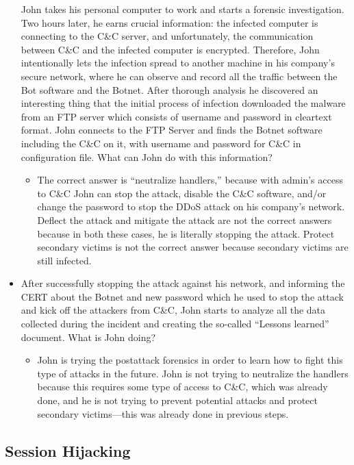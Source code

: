 \begin{itemize}
    John takes his personal computer to work and starts a forensic investigation. Two hours later, he earns crucial information: the infected computer is connecting to the C\&C server, and unfortunately, the communication between C\&C and the infected computer is encrypted. Therefore, John intentionally lets the infection spread to another machine in his company's secure network, where he can observe and record all the traffic between the Bot software and the Botnet. After thorough analysis he discovered an interesting thing that the initial process of infection downloaded the malware from an FTP server which consists of username and password in cleartext format. John connects to the FTP Server and finds the Botnet software including the C\&C on it, with username and password for C\&C in configuration file. What can John do with this information?
    \begin{itemize}
        \item The correct answer is “neutralize handlers,” because with admin's access to C\&C John can stop the attack, disable the C\&C software, and/or change the password to stop the DDoS attack on his company's network. Deflect the attack and mitigate the attack are not the correct answers because in both these cases, he is literally stopping the attack. Protect secondary victims is not the correct answer because secondary victims are still infected.
    \end{itemize}
    \item After successfully stopping the attack against his network, and informing the CERT about the Botnet and new password which he used to stop the attack and kick off the attackers from C\&C, John starts to analyze all the data collected during the incident and creating the so-called “Lessons learned” document. What is John doing?
    \begin{itemize}
        \item John is trying the postattack forensics in order to learn how to fight this type of attacks in the future. John is not trying to neutralize the handlers because this requires some type of access to C\&C, which was already done, and he is not trying to prevent potential attacks and protect secondary victims—this was already done in previous steps.
    \end{itemize}
\end{itemize}


\subsection{Session Hijacking}
